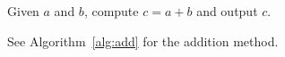 \documentclass{article}
\begin{document}
\begin{algorithm}
\caption{Add two numbers}\label{alg:add}
Given $a$ and $b$, compute $c = a + b$ and output $c$.
\end{algorithm}
See Algorithm~\ref{alg:add} for the addition method.
\end{document}
